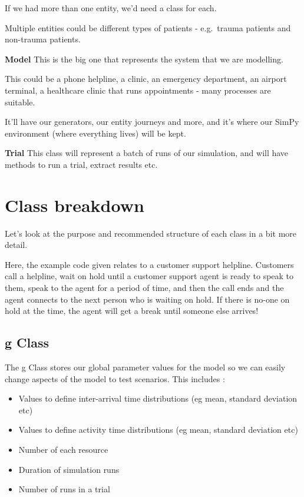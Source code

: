 \documentclass[
  letterpaper,
  DIV=11,
  numbers=noendperiod]{scrreprt}
\providecommand{\tightlist}{%
  \setlength{\itemsep}{0pt}\setlength{\parskip}{0pt}}\usepackage{longtable,booktabs,array}
\begin{document}
If we had more than one entity, we'd need a class for each.

Multiple entities could be different types of patients - e.g.~trauma
patients and non-trauma patients.

\textbf{Model} This is the big one that represents the system that we
are modelling.

This could be a phone helpline, a clinic, an emergency department, an
airport terminal, a healthcare clinic that runs appointments - many
processes are suitable.

It'll have our generators, our entity journeys and more, and it's where
our SimPy environment (where everything lives) will be kept.

\textbf{Trial} This class will represent a batch of runs of our
simulation, and will have methods to run a trial, extract results etc.

\section{Class breakdown}\label{class-breakdown}

Let's look at the purpose and recommended structure of each class in a
bit more detail.

Here, the example code given relates to a customer support helpline.
Customers call a helpline, wait on hold until a customer support agent
is ready to speak to them, speak to the agent for a period of time, and
then the call ends and the agent connects to the next person who is
waiting on hold. If there is no-one on hold at the time, the agent will
get a break until someone else arrives!

\subsection{g Class}\label{g-class}

The g Class stores our global parameter values for the model so we can
easily change aspects of the model to test scenarios. This includes :

\begin{itemize}
\tightlist
\item
  Values to define inter-arrival time distributions (eg mean, standard
  deviation etc)
\item
  Values to define activity time distributions (eg mean, standard
  deviation etc)
\item
  Number of each resource
\item
  Duration of simulation runs
\item
  Number of runs in a trial
\end{itemize}
\end{document}
